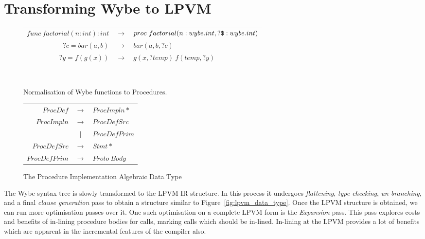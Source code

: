 \chapter{Transforming Wybe to LPVM}
\label{chap:wybe_to_lpvm}

\begin{figure}
  \centering
  \begin{tabular}{r c l}

    \( func\ factorial(n:int):int \) & \(\rightarrow \) & 
                                                          \( proc\ factorial(n:wybe.int, ?\verb+$+:wybe.int) \) \\
    \( ?c = bar(a, b) \) & \(\rightarrow\) & \( bar(a, b, ?c) \) \\
    \( ?y = f(g(x)) \) & \(\rightarrow\) & \( g(x, ?temp)\ f(temp, ?y) \) \\


  \end{tabular}
  \\
  \caption{Normalisation of Wybe functions to Procedures.}
  \label{fig:wybe_convert_to_proc}
\end{figure}



\begin{figure}
  \centering
  \begin{tabular}{r c l}
    \( ProcDef \)     & \( \rightarrow \) & \( ProcImpln* \)   \\
    \( ProcImpln \)   & \( \rightarrow \) & \( ProcDefSrc \)   \\
                      & \( \rvert \)        & \( ProcDefPrim \)  \\
    \( ProcDefSrc \)  & \( \rightarrow \) & \( Stmt* \)        \\
    \( ProcDefPrim \) & \( \rightarrow \) & \( Proto\ Body \)  \\
  \end{tabular}
  \caption{The Procedure Implementation Algebraic Data Type}
  \label{fig:proc_impln}
\end{figure}



The Wybe syntax tree is slowly transformed to the LPVM IR structure. In this
process it undergoes \textit{flattening}, \textit{type checking},
\textit{un-branching}, and a final \textit{clause generation} pass to obtain a structure
similar to Figure~\ref{fig:lpvm_data_type}. Once the LPVM structure is
obtained, we can run more optimisation passes over it. One such optimisation on
a complete LPVM form is the \textit{Expansion} pass. This pass explores costs
and benefits of in-lining procedure bodies for calls, marking calls which
should be in-lined. In-lining at the LPVM provides a lot of benefits which are
apparent in the incremental features of the compiler also.

